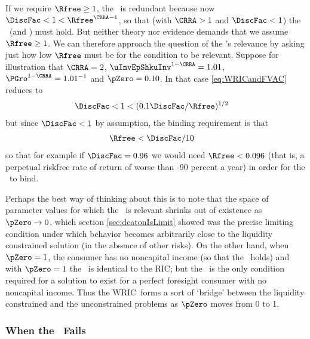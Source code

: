 \documentclass[BufferStockTheory]{subfiles}
\begin{document}
If we require $\Rfree \geq 1$, the \WRIC~is redundant because now $\DiscFac <1<\Rfree^{\CRRA-1}$, so that (with $\CRRA > 1$ and $\DiscFac<1$) the \RIC~(and \WRIC) must hold.  But neither theory nor evidence demands that we assume $\Rfree \geq
1$.  We can therefore approach the question of the \WRIC's relevance by
asking just how low $\Rfree$ must be for the condition to be relevant.
Suppose for illustration that $\CRRA=2$, $\uInvEpShkuInv^{1-\CRRA}=1.01$,
$\PGro^{1-\CRRA}=1.01^{-1}$ and $\pZero = 0.10$.  In that case
\eqref{eq:WRICandFVAC} reduces to
\begin{align*}
  \DiscFac  & < 1 < (0.1 \DiscFac/\Rfree)^{1/2} 
\end{align*}
but since $\DiscFac < 1$ by assumption, the binding requirement is that
\begin{align*}
  \Rfree  & < \DiscFac/10 \notag
\end{align*}
so that for example if $\DiscFac=0.96$ we would need $\Rfree < 0.096$
(that is, a perpetual riskfree rate of return of worse than -90
percent a year) in order for the \WRIC~to bind. %

Perhaps the best way of thinking about this is to note that the space
of parameter values for which the \WRIC~is relevant shrinks out of
existence as $\pZero \rightarrow 0$, which section
\ref{sec:deatonIsLimit} showed was the precise limiting condition
under which behavior becomes arbitrarily close to the liquidity
constrained solution (in the absence of other risks).  On the other
hand, when $\pZero = 1$, the consumer has no noncapital income (so
that the \FHWC~holds) and with $\pZero=1$ the \WRIC~is identical to the
RIC; but the \RIC~is
the only condition required for a solution to exist
for a perfect foresight consumer with no noncapital income.  Thus the
WRIC~forms a sort of `bridge' between the liquidity constrained and
the unconstrained problems as $\pZero$ moves from 0 to 1.

\hypertarget{IntuitionRIC}{}
\subsubsection{When the \RIC~Fails}\label{subsubsec:WhenTheRICFails}
\end{document}
